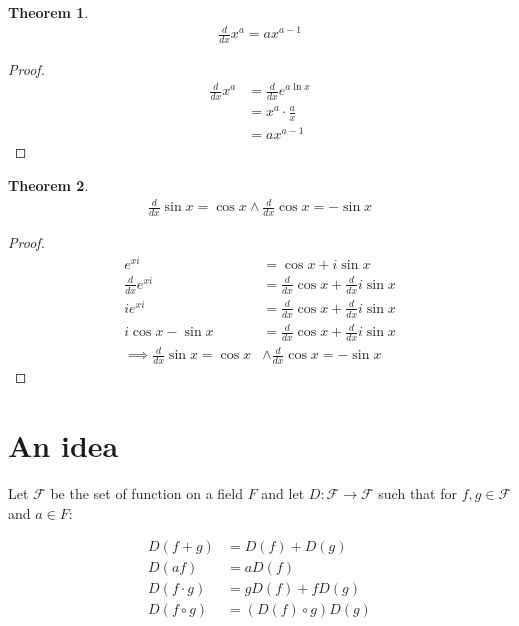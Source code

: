 \documentclass{article}
\theoremstyle{plain}
\newtheorem{theorem}{Theorem}
\theoremstyle{definition}
\begin{document}
\begin{theorem}
\begin{align}
    \frac{d}{dx} x^a= ax^{a-1}
\end{align}
\end{theorem}
\begin{proof}
\begin{align}
    \frac{d}{dx} x^a &= \frac{d}{dx} e^{a \ln x} \\ \nonumber
                     &= x^a \cdot \frac{a}{x} \\ \nonumber
                     &= ax^{a-1} \nonumber
\end{align}
\end{proof}
\begin{theorem}
\begin{align}
    \frac{d}{dx} \sin x = \cos x \land \frac{d}{dx} \cos x = -\sin x
\end{align}
\end{theorem}
\begin{proof}
\begin{align}
    e^{xi} &= \cos x + i \sin x \\ \nonumber \frac{d}{dx} e^{xi} &=
    \frac{d}{dx} \cos x + \frac{d}{dx} i \sin x \\ \nonumber ie^{xi} &=
    \frac{d}{dx} \cos x + \frac{d}{dx} i \sin x \\ \nonumber i\cos x -
    \sin x &= \frac{d}{dx} \cos x + \frac{d}{dx} i \sin x \\ \nonumber
    \implies \frac{d}{dx} \sin x = \cos x &\land \frac{d}{dx} \cos x =
    -\sin x
\end{align}
\end{proof}

\section{An idea}
Let $\mathcal{F}$ be the set of function on a field $F$ and let $D:
\mathcal{F} \rightarrow \mathcal{F}$ such that for $f,g \in \mathcal{F}$
and $a \in F$:

\begin{align}
    D(f+g)       &= D(f)+D(g) \\
    D(af)        &= aD(f) \\
    D(f\cdot g)  &= gD(f)+fD(g) \\
    D(f \circ g) &= (D(f) \circ g)D(g)
\end{align}
\end{document}
